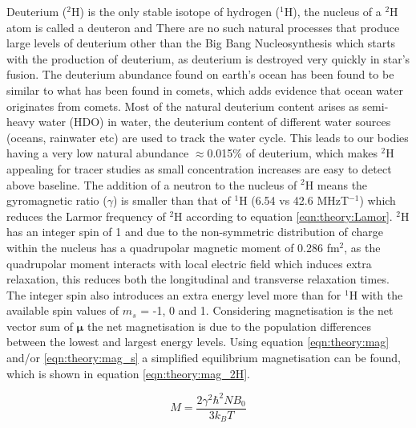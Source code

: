 \documentclass[class=article, crop=false]{standalone}
\begin{document}
Deuterium ($^2$H) is the only stable isotope of hydrogen ($^1$H), the nucleus of a $^2$H atom is called a deuteron and There are no such natural processes that produce large levels of deuterium other than the Big Bang Nucleosynthesis which starts with the production of deuterium, as deuterium is destroyed very quickly in star's fusion\cite{Patrignani2016ReviewPhysics}. The deuterium abundance found on earth's ocean has been found to be similar to what has been found in comets, which adds evidence that ocean water originates from comets\cite{Hersant2001APlanets}. Most of the natural deuterium content arises as semi-heavy water (HDO) in water, the deuterium content of different water sources (oceans, rainwater etc) are used to track the water cycle\cite{Bowen2019IsotopesApplications}. This leads to our bodies having a very low natural abundance $\approx$0.015\% of deuterium, which makes $^2$H appealing for tracer studies as small concentration increases are easy to detect above baseline. The addition of a neutron to the nucleus of $^2$H means the gyromagnetic ratio ($\gamma$) is smaller than that of $^1$H (6.54 vs 42.6 MHzT$^{-1}$) which reduces the Larmor frequency of $^2$H according to equation \ref{eqn:theory:Lamor}. $^2$H has an integer spin of 1 and due to the non-symmetric distribution of charge within the nucleus has a quadrupolar magnetic moment of 0.286 fm$^2$, as the quadrupolar moment interacts with local electric field which induces extra relaxation, this reduces both the longitudinal and transverse relaxation times. The integer spin also introduces an extra energy level more than for $^1$H with the available spin values of $m_s$ = -1, 0 and 1. Considering magnetisation is the net vector sum of $\mathbf{\mu}$ the net magnetisation is due to the population differences between the lowest and largest energy levels. Using equation \ref{eqn:theory:mag} and/or \ref{eqn:theory:mag_s} a simplified equilibrium magnetisation can be found, which is shown in equation \ref{eqn:theory:mag_2H}.

\begin{equation}
    M = \frac{2\gamma^2 \hbar^2 N B_0}{3k_BT}
    \label{eqn:theory:mag_2H}
\end{equation}
\end{document}

